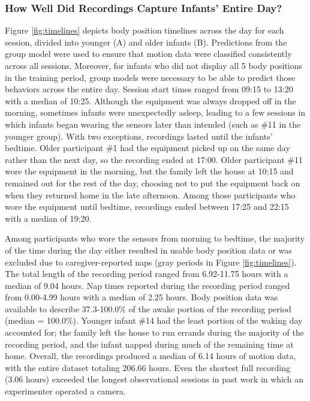 \documentclass[
  man]{apa6}
\begin{document}
\hypertarget{how-well-did-recordings-capture-infants-entire-day}{%
\subsubsection{How Well Did Recordings Capture Infants' Entire Day?}\label{how-well-did-recordings-capture-infants-entire-day}}

Figure \ref{fig:timelines} depicts body position timelines across the day for each session, divided into younger (A) and older infants (B). Predictions from the group model were used to ensure that motion data were classified consistently across all sessions. Moreover, for infants who did not display all 5 body positions in the training period, group models were necessary to be able to predict those behaviors across the entire day. Session start times ranged from 09:15 to 13:20 with a median of 10:25. Although the equipment was always dropped off in the morning, sometimes infants were unexpectedly asleep, leading to a few sessions in which infants began wearing the sensors later than intended (such as \#11 in the younger group). With two exceptions, recordings lasted until the infants' bedtime. Older participant \#1 had the equipment picked up on the same day rather than the next day, so the recording ended at 17:00. Older participant \#11 wore the equipment in the morning, but the family left the house at 10:15 and remained out for the rest of the day, choosing not to put the equipment back on when they returned home in the late afternoon. Among those participants who wore the equipment until bedtime, recordings ended between 17:25 and 22:15 with a median of 19:20.

Among participants who wore the sensors from morning to bedtime, the majority of the time during the day either resulted in usable body position data or was excluded due to caregiver-reported naps (gray periods in Figure \ref{fig:timelines}). The total length of the recording period ranged from 6.92-11.75 hours with a median of 9.04 hours. Nap times reported during the recording period ranged from 0.00-4.99 hours with a median of 2.25 hours. Body position data was available to describe 37.3-100.0\% of the awake portion of the recording period (median = 100.0\%). Younger infant \#14 had the least portion of the waking day accounted for; the family left the house to run errands during the majority of the recording period, and the infant napped during much of the remaining time at home. Overall, the recordings produced a median of 6.14 hours of motion data, with the entire dataset totaling 206.66 hours. Even the shortest full recording (3.06 hours) exceeded the longest observational sessions in past work in which an experimenter operated a camera.
\end{document}
